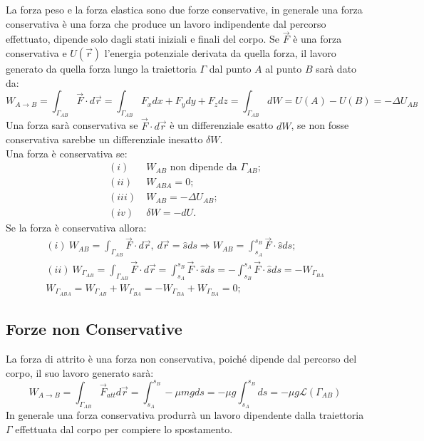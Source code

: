 \documentclass{article}
\numberwithin{equation}{subsection}
\begin{document}
La forza peso e la forza elastica sono due forze conservative, in 
generale una forza conservativa è una forza che produce un lavoro 
indipendente dal percorso effettuato, dipende solo dagli stati iniziali 
e finali del corpo. Se $\vec{F}$ è una forza conservativa e $U(\vec{r})$ 
l'energia potenziale derivata da quella forza, il lavoro generato da quella forza lungo 
la traiettoria $\Gamma$ dal punto $A$ al punto $B$ sarà dato da: 
\begin{equation}
    W_{A\to B}=\displaystyle\int_{\Gamma_{AB}}\vec{F}\cdot d\vec{r}=\int_{\Gamma_{AB}}F_xdx+F_ydy+F_zdz=\int_{\Gamma_{AB}}dW=U(A)-U(B)=-\Delta U_{AB}
\end{equation}
Una forza sarà conservativa se $\vec{F}\cdot d\vec{r}$ è un differenziale 
esatto $dW$, se non fosse conservativa sarebbe un differenziale inesatto 
$\delta W$.\\
Una forza è conservativa se:
\begin{align}
    (i)\:& W_{AB} \mbox{ non dipende da }\Gamma_{AB};\\
    (ii)\:&W_{ABA}=0;\\
    (iii)\:& W_{AB}=-\Delta U_{AB};\\
    (iv)\:& \delta W =-dU.
\end{align}
Se la forza è conservativa allora:
\begin{gather}
    (i)\:W_{AB}=\displaystyle\int_{\Gamma_{AB}}\vec{F}\cdot d\vec{r},\:d\vec{r}=\hat{s}ds\Rightarrow W_{AB}=\int_{s_A}^{s_B}\vec{F}\cdot\hat{s}ds; \\
    (ii)\:W_{\Gamma_{AB}}=\displaystyle\int_{\Gamma_{AB}}\vec{F}\cdot d\vec{r}=\int_{s_A}^{s_B}\vec{F}\cdot\hat{s}ds=-\int_{s_B}^{s_A}\vec{F}\cdot\hat{s}ds=-W_{\Gamma_{BA}}\\
    W_{\Gamma_{ABA}}=W_{\Gamma_{AB}}+W_{\Gamma_{BA}}=-W_{\Gamma_{BA}}+W_{\Gamma_{BA}}=0;
\end{gather}

\subsection{Forze non Conservative}
La forza di attrito è una forza non conservativa, poiché dipende 
dal percorso del corpo, il suo lavoro generato sarà:
\begin{equation}
    W_{A\to B}=\displaystyle\int_{\Gamma_{AB}}\vec{F}_{att}d\vec{r}=\int_{s_A}^{s_B}-\mu mgds=-\mu g\int_{s_A}^{s_B}ds=-\mu g\mathscr{L}(\Gamma_{AB})
\end{equation}
In generale una forza conservativa produrrà un lavoro dipendente 
dalla traiettoria $\Gamma$ effettuata dal corpo per compiere lo spostamento.
\end{document}

